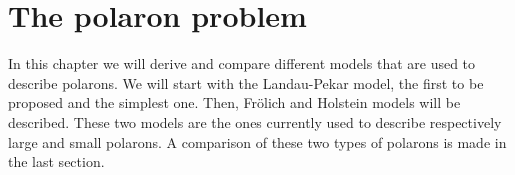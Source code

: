 \chapter{The polaron problem} \label{ch:polarons}

In this chapter we will derive and compare different models that are used to describe polarons. We will start with the Landau-Pekar model, the first to be proposed and the simplest one. Then, Fr\"{o}lich and Holstein models will be described. These two models are the ones currently used to describe respectively large and small polarons. A comparison of these two types of polarons is made in the last section.




